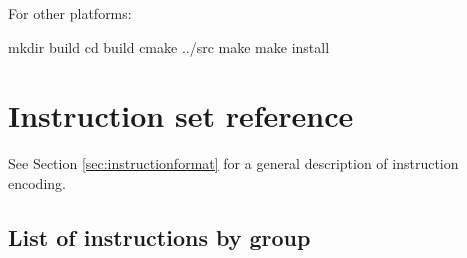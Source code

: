 \documentclass[a4paper,12pt,twoside,extrafontsizes]{memoir}
\begin{document}
For other platforms:

\begin{codepar}
    mkdir build
    cd build
    cmake ../src
    make
    make install
\end{codepar}

\appendix

\chapter{Instruction set reference}
\label{app:instructionset}

See Section \ref{sec:instructionformat} for a general description of \lxp{} instruction encoding.

\section{List of instructions by group}
\end{document}
